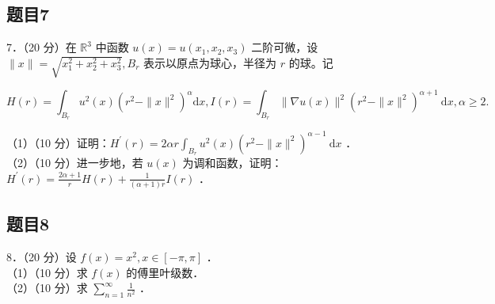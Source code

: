 \documentclass{article}
\begin{document}
\subsection{题目7}
7．（20 分）在 \(\mathbb{R}^{3}\) 中函数 \(u(x)=u\left(x_{1}, x_{2}, x_{3}\right)\) 二阶可微，设 \(\|x\|=\sqrt{x_{1}^{2}+x_{2}^{2}+x_{3}^{2}}, B_{r}\) 表示以原点为球心，半径为 \(r\) 的球。记

\[
H(r)=\int_{B_{r}} u^{2}(x)\left(r^{2}-\|x\|^{2}\right)^{\alpha} \mathrm{d} x, I(r)=\int_{B_{r}}\|\nabla u(x)\|^{2}\left(r^{2}-\|x\|^{2}\right)^{\alpha+1} \mathrm{~d} x, \alpha \geq 2 .
\]

（1）（10 分）证明：\(H^{\prime}(r)=2 \alpha r \int_{B_{r}} u^{2}(x)\left(r^{2}-\|x\|^{2}\right)^{\alpha-1} \mathrm{~d} x\) ．\\
（2）（10 分）进一步地，若 \(u(x)\) 为调和函数，证明：\(H^{\prime}(r)=\frac{2 \alpha+1}{r} H(r)+\frac{1}{(\alpha+1) r} I(r)\) ．

\subsection{题目8}
8．（20 分）设 \(f(x)=x^{2}, x \in[-\pi, \pi]\) ．\\
（1）（10 分）求 \(f(x)\) 的傅里叶级数．\\
（2）（10 分）求 \(\sum_{n=1}^{\infty} \frac{1}{n^{2}}\) ．
\end{document}
